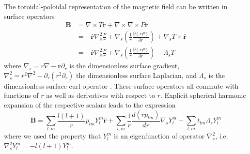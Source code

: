 The toroidal-poloidal representation of the magnetic field can be written in surface operators
%
\begin{equation}
\begin{aligned}
    \mathbf{B} &= \nabla\times T\mathbf{r} + \nabla\times \nabla\times P\mathbf{r} \\ 
    &= - \hat{\mathbf{r}} \nabla_s^2 \frac{P}{r} + \nabla_s \left(\frac{1}{r} \frac{\partial (rP)}{\partial r}\right) + \nabla_s T \times \hat{\mathbf{r}} \\ 
    &= - \hat{\mathbf{r}} \nabla_s^2 \frac{P}{r} + \nabla_s \left(\frac{1}{r} \frac{\partial (rP)}{\partial r}\right) - \Lambda_s T
\end{aligned}
\end{equation}
%
where $\nabla_s = r \nabla - \mathbf{r}\partial_r$ is the dimensionless surface gradient, $\nabla_s^2 = r^2 \nabla^2 - \partial_r (r^2 \partial_r)$ the dimensionless surface Laplacian, and $\Lambda_s$ is the dimensionless surface curl operator \citep{backus_poloidal_1986}. These surface operators all commute with functions of $r$ as well as derivatives with respect to $r$.
Explicit spherical harmonic expansion of the respective scalars leads to the expression
%
\begin{equation}
    \mathbf{B} = \sum_{l,m} \frac{l(l+1)}{r} p_{lm} Y_l^m \hat{\mathbf{r}} + \sum_{l,m} \frac{1}{r}\frac{d\left(r p_{lm}\right)}{dr} \nabla_s Y_l^m - \sum_{l,m} t_{lm} \Lambda_s Y_l^m
\end{equation}
%
where we used the property that $Y_l^m$ is an eigenfunction of operator $\nabla_s^2$, i.e. $\nabla_s^2 Y_l^m = -l(l+1) Y_l^m$.

